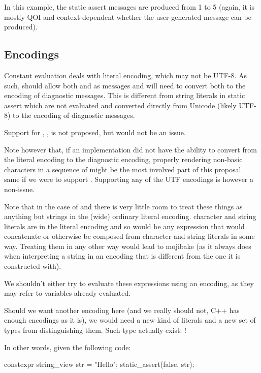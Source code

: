 \documentclass{wg21}
\begin{document}
In this example, the static assert messages are produced from 1 to 5 (again, it is mostly QOI and context-dependent whether the user-generated message can be produced).

\subsection{Encodings}

Constant evaluation deals with literal encoding, which may not be UTF-8.
As such,  should allow both  and  as messages and will need to convert both to the encoding of diagnostic messages.
This is different from string literals in static assert which are not evaluated and converted directly from Unicode (likely UTF-8) to the encoding of diagnostic messages.

Support for , ,  is not proposed, but would not be an issue.

Note however that, if an implementation did not have the ability to convert from the literal encoding to the diagnostic encoding,
properly rendering non-basic characters in a sequence of  might be the most involved part of this proposal. same if we were to support .
Supporting any of the UTF encodings is however a non-issue.

Note that in the case of  and  there is very little room to treat these things as anything but strings in the (wide) ordinary literal encoding.
character and string literals are in the literal encoding and so would be any expression that would concatenate or otherwise be composed from
character and string literals in some way.
Treating them in any other way would lead to mojibake (as it always does when interpreting a string in an encoding that is different from the one it is constructed with).

We shouldn't either try to evaluate these expressions using an encoding, as they may refer to variables already evaluated.

Should we want another encoding here (and we really should not, C++ has enough encodings as it is), we would need a new kind of literals and a new set of types from distinguishing them. Such type actually exist: !

In other words, given the following code:

\begin{colorblock}
constexpr string_view str = "Hello";
static_assert(false, str);
\end{colorblock}
\end{document}
